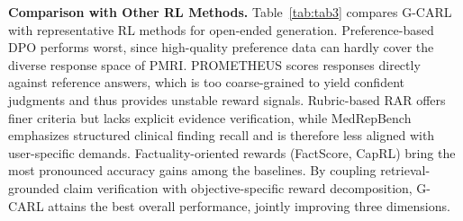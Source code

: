 \documentclass[letterpaper]{article} %
\begin{document}




\vspace{1pt}
\noindent \textbf{Comparison with Other RL Methods.}
Table~\ref{tab:tab3} compares G-CARL with representative RL methods for open-ended generation. Preference-based DPO performs worst, since high-quality preference data can hardly cover the diverse response space of PMRI. PROMETHEUS scores responses directly against reference answers, which is too coarse-grained to yield confident judgments and thus provides unstable reward signals. Rubric-based RAR offers finer criteria but lacks explicit evidence verification, while MedRepBench emphasizes structured clinical finding recall and is therefore less aligned with user-specific demands. Factuality-oriented rewards (FactScore, CapRL) bring the most pronounced accuracy gains among the baselines. By coupling retrieval-grounded claim verification with objective-specific reward decomposition, G-CARL attains the best overall performance, jointly improving three dimensions.
\end{document}

